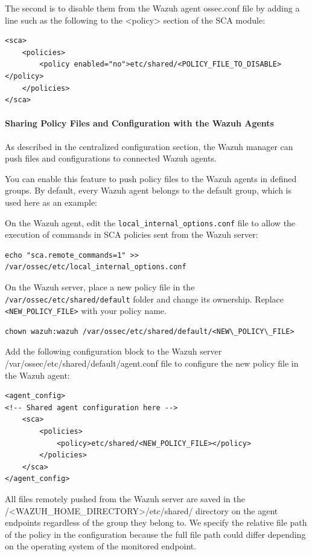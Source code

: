 The second is to disable them from the Wazuh agent ossec.conf file by adding a line such as the following to the <policy> section of the SCA module:

\begin{verbatim}
<sca>
    <policies>
        <policy enabled="no">etc/shared/<POLICY_FILE_TO_DISABLE></policy>
    </policies>
</sca>
\end{verbatim}

\paragraph{Sharing Policy Files and Configuration with the Wazuh Agents}
As described in the centralized configuration section, the Wazuh manager can push files and configurations to connected Wazuh agents.

You can enable this feature to push policy files to the Wazuh agents in defined groups. By default, every Wazuh agent belongs to the default group, which is used here as an example:

On the Wazuh agent, edit the \texttt{local\_internal\_options.conf} file to allow the execution of commands in SCA policies sent from the Wazuh server:


\begin{verbatim}
echo "sca.remote_commands=1" >> /var/ossec/etc/local_internal_options.conf
\end{verbatim}

On the Wazuh server, place a new policy file in the \texttt{/var/ossec/etc/shared/default} folder and change its ownership. Replace \texttt{<NEW\_POLICY\_FILE>} with your policy name.

\begin{verbatim}
chown wazuh:wazuh /var/ossec/etc/shared/default/<NEW\_POLICY\_FILE>
\end{verbatim}

Add the following configuration block to the Wazuh server /var/ossec/etc/shared/default/agent.conf file to configure the new policy file in the Wazuh agent:

\begin{verbatim}
<agent_config>
<!-- Shared agent configuration here -->
    <sca>
        <policies>
            <policy>etc/shared/<NEW_POLICY_FILE></policy>
        </policies>
    </sca>
</agent_config>
\end{verbatim}

All files remotely pushed from the Wazuh server are saved in the /<WAZUH\_HOME\_DIRECTORY>/etc/shared/ directory on the agent endpoints regardless of the group they belong to. We specify the relative file path of the policy in the configuration because the full file path could differ depending on the operating system of the monitored endpoint.

